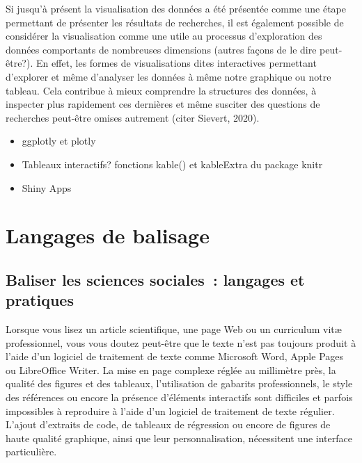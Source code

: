 \documentclass[
  letterpaper,
  DIV=11,
  numbers=noendperiod]{scrreprt}
\providecommand{\tightlist}{%
  \setlength{\itemsep}{0pt}\setlength{\parskip}{0pt}}\usepackage{longtable,booktabs,array}
\begin{document}
Si jusqu'à présent la visualisation des données a été présentée comme
une étape permettant de présenter les résultats de recherches, il est
également possible de considérer la visualisation comme une utile au
processus d'exploration des données comportants de nombreuses dimensions
(autres façons de le dire peut-être?). En effet, les formes de
visualisations dites interactives permettant d'explorer et même
d'analyser les données à même notre graphique ou notre tableau. Cela
contribue à mieux comprendre la structures des données, à inspecter plus
rapidement ces dernières et même susciter des questions de recherches
peut-être omises autrement (citer Sievert, 2020).

\begin{itemize}
\tightlist
\item
  ggplotly et plotly
\item
  Tableaux interactifs? fonctions kable() et kableExtra du package knitr
\item
  Shiny Apps
\end{itemize}


\chapter{Langages de balisage}\label{langages-de-balisage}

\section{Baliser les sciences sociales~: langages et
pratiques}\label{sec-chap7}

Lorsque vous lisez un article scientifique, une page Web ou un
curriculum vitæ professionnel, vous vous doutez peut-être que le texte
n'est pas toujours produit à l'aide d'un logiciel de traitement de texte
comme Microsoft Word, Apple Pages ou LibreOffice Writer. La mise en page
complexe réglée au millimètre près, la qualité des figures et des
tableaux, l'utilisation de gabarits professionnels, le style des
références ou encore la présence d'éléments interactifs sont difficiles
et parfois impossibles à reproduire à l'aide d'un logiciel de traitement
de texte régulier. L'ajout d'extraits de code, de tableaux de régression
ou encore de figures de haute qualité graphique, ainsi que leur
personnalisation, nécessitent une interface particulière.
\end{document}
